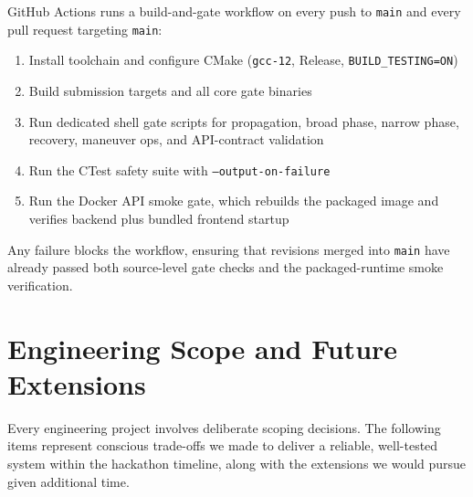 \documentclass[10pt,twocolumn,letterpaper]{article}
\begin{document}
GitHub Actions runs a build-and-gate workflow on every push to
\texttt{main} and every pull request targeting \texttt{main}:

\begin{enumerate}[nosep,leftmargin=*]
  \item Install toolchain and configure CMake (\texttt{gcc-12}, Release,
    \texttt{BUILD\_TESTING=ON})
  \item Build submission targets and all core gate binaries
  \item Run dedicated shell gate scripts for propagation, broad phase,
    narrow phase, recovery, maneuver ops, and API-contract validation
  \item Run the CTest safety suite with \texttt{--output-on-failure}
  \item Run the Docker API smoke gate, which rebuilds the packaged image
    and verifies backend plus bundled frontend startup
\end{enumerate}

\noindent
Any failure blocks the workflow, ensuring that revisions merged into
\texttt{main} have already passed both source-level gate checks and the
packaged-runtime smoke verification.

\section{Engineering Scope and Future Extensions}

Every engineering project involves deliberate scoping decisions.  The
following items represent conscious trade-offs we made to deliver a
reliable, well-tested system within the hackathon timeline, along with
the extensions we would pursue given additional time.
\end{document}
